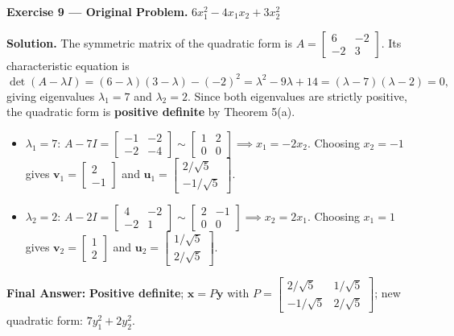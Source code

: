 \documentclass[11pt, letterpaper]{article}
\theoremstyle{definition}
\theoremstyle{remark}
\begin{document}
\medskip

\textbf{Exercise 9 --- Original Problem.} $6x_1^2 - 4x_1x_2 + 3x_2^2$

\textbf{Solution.}
The symmetric matrix of the quadratic form is $A = \begin{bmatrix} 6 & -2 \\ -2 & 3 \end{bmatrix}$. Its characteristic equation is
\[
\det(A - \lambda I) = (6 - \lambda)(3 - \lambda) - (-2)^2 = \lambda^2 - 9\lambda + 14 = (\lambda - 7)(\lambda - 2) = 0,
\]
giving eigenvalues $\lambda_1 = 7$ and $\lambda_2 = 2$. Since both eigenvalues are strictly positive, the quadratic form is \textbf{positive definite} by Theorem 5(a).
\begin{itemize}
    \item $\lambda_1 = 7$: $A - 7I = \begin{bmatrix} -1 & -2 \\ -2 & -4 \end{bmatrix} \sim \begin{bmatrix} 1 & 2 \\ 0 & 0 \end{bmatrix} \implies x_1 = -2x_2$. Choosing $x_2 = -1$ gives $\mathbf{v}_1 = \begin{bmatrix} 2 \\ -1 \end{bmatrix}$ and $\mathbf{u}_1 = \begin{bmatrix} 2/\sqrt{5} \\ -1/\sqrt{5} \end{bmatrix}$.
    \item $\lambda_2 = 2$: $A - 2I = \begin{bmatrix} 4 & -2 \\ -2 & 1 \end{bmatrix} \sim \begin{bmatrix} 2 & -1 \\ 0 & 0 \end{bmatrix} \implies x_2 = 2x_1$. Choosing $x_1 = 1$ gives $\mathbf{v}_2 = \begin{bmatrix} 1 \\ 2 \end{bmatrix}$ and $\mathbf{u}_2 = \begin{bmatrix} 1/\sqrt{5} \\ 2/\sqrt{5} \end{bmatrix}$.
\end{itemize}

\textbf{Final Answer:} \textbf{Positive definite}; $\mathbf{x} = P\mathbf{y}$ with $P = \begin{bmatrix} 2/\sqrt{5} & 1/\sqrt{5} \\ -1/\sqrt{5} & 2/\sqrt{5} \end{bmatrix}$; new quadratic form: $7y_1^2 + 2y_2^2$.
\end{document}
